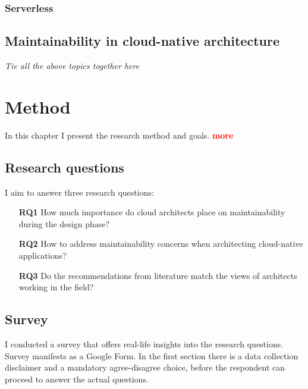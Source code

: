 \documentclass[utf8,english]{gradu3}
\newcommand{\todo}[1]{\textbf{\textcolor{red}{#1}}}
\newcommand{\tmp}[1]{\textit{{#1}}}
\begin{document}
\subsection{Serverless}

\section{Maintainability in cloud-native architecture}
\tmp{Tie all the above topics together here}

\chapter{Method}

In this chapter I present the research method and goals. \todo{more}

\section{Research questions}

I aim to answer three research questions:
\begin{itemize}
  \item [\textbf{RQ1}] How much importance do cloud architects place on maintainability during
        the design phase?
  \item [\textbf{RQ2}] How to address maintainability concerns when architecting cloud-native
        applications?
  \item [\textbf{RQ3}] Do the recommendations from literature match the views of architects
        working in the field?
\end{itemize}


\section{Survey}

I conducted a survey that offers real-life insights into the research questions.
Survey manifests as a Google Form.
In the first section there is a data collection disclaimer and a mandatory agree-disagree choice,
before the respondent can proceed to answer the actual questions.
\end{document}
